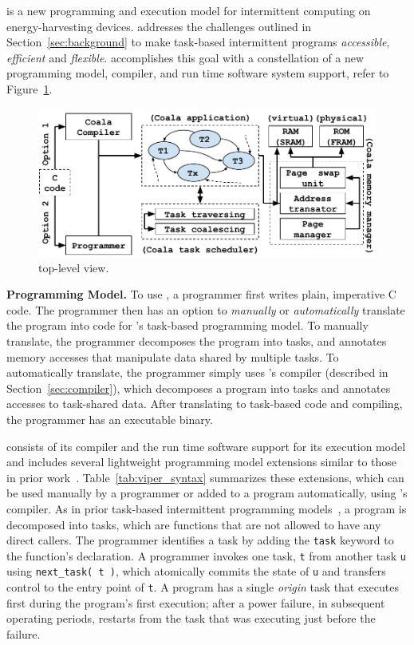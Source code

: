 \sys is a new programming and execution model for intermittent computing on energy-harvesting devices. \sys addresses the challenges outlined in Section~\ref{sec:background} to make task-based intermittent programs {\em accessible}, {\em efficient} and {\em flexible}. \sys accomplishes this goal with a constellation of a new programming model, compiler, and run time software system support, refer to Figure~\ref{fig:system_overview}.

\begin{figure}
	\centering
	\includegraphics[width=\columnwidth]{figures/viper_block_diagram.pdf}
	\caption{\sys top-level view.}
	\label{fig:system_overview}
\end{figure}

\textbf{\sys Programming Model.} To use \sys, a programmer first writes plain, imperative C code. The programmer then has an option to {\em manually} or {\em automatically} translate the program into code for \sys's task-based programming model. To manually translate, the programmer decomposes the program into tasks, and annotates memory accesses that manipulate data shared by multiple tasks. To automatically translate, the programmer simply uses \sys's compiler (described in Section~\ref{sec:compiler}), which decomposes a program into tasks and annotates accesses to task-shared data. After translating to task-based code and compiling, the programmer has an executable \sys binary.

\sys consists of its compiler and the run time software support for its execution model and includes several lightweight programming model extensions similar to those in prior work~\cite{chain,alpaca}. Table~\ref{tab:viper_syntax} summarizes these extensions, which can be used manually by a programmer or added to a program automatically, using \sys's compiler. As in prior task-based intermittent programming models~\cite{chain,alpaca}, a \sys program is decomposed into tasks, which are functions that are not allowed to have any direct callers. The programmer identifies a task by adding the {\tt task} keyword to the function's declaration. A programmer invokes one task, {\tt t} from another task {\tt u} using {\tt next\_task(\,t\,)}, which atomically commits the state of {\tt u} and transfers control to the entry point of {\tt t}. A program has a single {\em origin} task that executes first during the program's first execution; after a power failure, in subsequent operating periods, \sys restarts from the task that was executing just before the failure.

